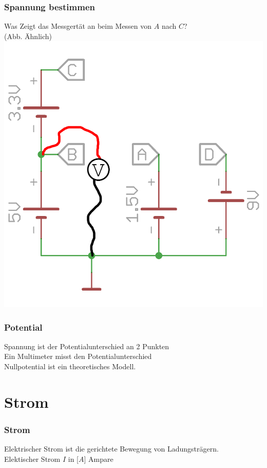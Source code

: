 \begin{frame}
    \frametitle{Spannung bestimmen}
    \begin{center}
    Was Zeigt das Messgertät an beim Messen von $A$ nach $C$?\\
    (Abb. Ähnlich)
        \includegraphics[width=.75\textwidth]{e02/SpannungMess.png}
	\end{center}
\end{frame}

\begin{frame}
    \frametitle{Potential}
    \begin{center}
    Spannung ist der Potentialunterschied an 2 Punkten\\
    Ein Multimeter misst den Potentialunterschied\\
    Nullpotential ist ein theoretisches Modell.
	\end{center}
\end{frame}

\section*{Strom}

\begin{frame}
    \frametitle{Strom}
    \begin{center}
        Elektrischer Strom ist die gerichtete Bewegung von Ladungsträgern.\\
        Elektischer Strom $I$ in [$A$] Ampare
	\end{center}
\end{frame}

